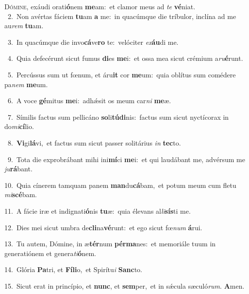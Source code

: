 \lettrine{\initial\textcolor{\initialcolor}{D}}{ómine,} exáudi orati\-\textbf{ó}\-nem \textbf{me}\-am:~\star et clamor meus ad \textit{te} \textbf{vé}\-niat.\\
{\numbfont\textcolor{\numbcolor}{~2.}}~Non avértas fáciem \textbf{tu}\-am \textbf{a} me:~\star in quacúmque die tríbulor, inclína ad me au\textit{rem} \textbf{tu}\-am.\par
{\numbfont\textcolor{\numbcolor}{~3.}}~In quacúmque die invo\-\textbf{cá}\-ve\textbf{ro} te:~\star velóciter \textit{ex}\-\textbf{áu}di me.\par
{\numbfont\textcolor{\numbcolor}{~4.}}~Quia defecérunt sicut fumus \textbf{di}\-es \textbf{me}\-i:~\star et ossa mea sicut crémium a\-\textit{ru}\-\textbf{é}runt.\par
{\numbfont\textcolor{\numbcolor}{~5.}}~Percússus sum ut fœnum, et áru\textbf{it} cor \textbf{me}\-um:~\star quia oblítus sum comédere pa\textit{nem} \textbf{me}\-um.\par
{\numbfont\textcolor{\numbcolor}{~6.}}~A voce \textbf{gé}\-mitus \textbf{me}\-i:~\star adhǽsit os meum car\textit{ni} \textbf{me}\-æ.\par
{\numbfont\textcolor{\numbcolor}{~7.}}~Símilis factus sum pellicáno \textbf{so}\-li\-\textbf{tú}\-\textbf{di}nis:~\star factus sum sicut nyctícorax in do\-\textit{mi}\-\textbf{cí}lio.\par
{\numbfont\textcolor{\numbcolor}{~8.}}~\-\textbf{Vi}\-gi\-\textbf{lá}\-vi,~\star et factus sum sicut passer solitárius \textit{in} \textbf{tec}\-to.\par
{\numbfont\textcolor{\numbcolor}{~9.}}~Tota die exprobrábant mihi ini\-\textbf{mí}\-ci \textbf{me}\-i:~\star et qui laudábant me, advérsum me \textit{ju}\-\textbf{rá}bant.\par
{\numbfont\textcolor{\numbcolor}{10.}}~Quia cínerem tamquam panem \textbf{man}\-du\-\textbf{cá}\-bam,~\star et potum meum cum fletu \textit{mi}\-\textbf{scé}bam.\par
{\numbfont\textcolor{\numbcolor}{11.}}~A fácie iræ et indignati\-\textbf{ó}\-nis \textbf{tu}\-æ:~\star quia élevans al\-\textit{li}\-\textbf{sís}ti me.\par
{\numbfont\textcolor{\numbcolor}{12.}}~Dies mei sicut umbra de\-\textbf{cli}\-na\-\textbf{vé}\-runt:~\star et ego sicut fœ\textit{num} \textbf{á}\-rui.\par
{\numbfont\textcolor{\numbcolor}{13.}}~Tu autem, Dómine, in æ\-\textbf{tér}\-num \textbf{pér}\-\textbf{ma}nes:~\star et memoriále tuum in generatiónem et genera\-\textit{ti}\-\textbf{ó}nem.\par
{\numbfont\textcolor{\numbcolor}{14.}}~Glória \textbf{Pa}\-tri, et \textbf{Fí}\-\textbf{li}o,~\star et Spirítu\textit{i} \textbf{Sanc}\-to.\par
{\numbfont\textcolor{\numbcolor}{15.}}~Sicut erat in princípio, et \textbf{nunc}\-, et \textbf{sem}\-per,~\star et in sǽcula sæculó\-\textit{rum}\-. \textbf{A}\-men.\par
